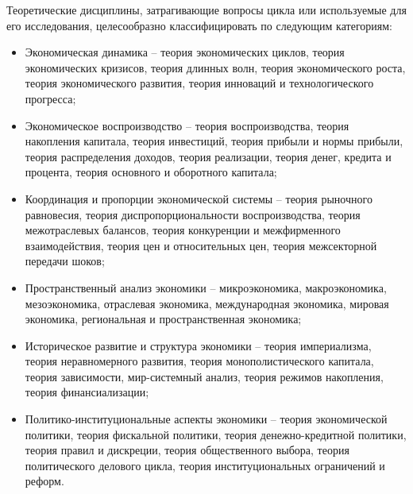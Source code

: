 Теоретические дисциплины, затрагивающие вопросы цикла или используемые для его исследования, целесообразно классифицировать по следующим категориям:
\begin{itemize}
    \item Экономическая динамика – теория экономических циклов, теория экономических кризисов, теория длинных волн, теория экономического роста, теория экономического развития, теория инноваций и технологического прогресса;
    \item Экономическое воспроизводство – теория воспроизводства, теория накопления капитала, теория инвестиций, теория прибыли и нормы прибыли, теория распределения доходов, теория реализации, теория денег, кредита и процента, теория основного и оборотного капитала;
    \item Координация и пропорции экономической системы – теория рыночного равновесия, теория диспропорциональности воспроизводства, теория межотраслевых балансов, теория конкуренции и межфирменного взаимодействия, теория цен и относительных цен, теория межсекторной передачи шоков;
    \item Пространственный анализ экономики – микроэкономика, макроэкономика, мезоэкономика, отраслевая экономика, международная экономика, мировая экономика, региональная и пространственная экономика;
    \item Историческое развитие и структура экономики – теория империализма, теория неравномерного развития, теория монополистического капитала, теория зависимости, мир-системный анализ, теория режимов накопления, теория финансиализации;
    \item Политико-институциональные аспекты экономики – теория экономической политики, теория фискальной политики, теория денежно-кредитной политики, теория правил и дискреции, теория общественного выбора, теория политического делового цикла, теория институциональных ограничений и реформ.
\end{itemize}

